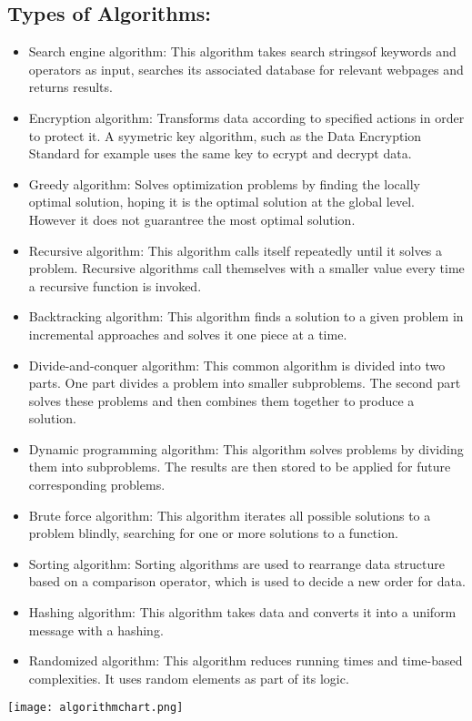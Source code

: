 \documentclass[a4paper]{article}
\begin{document}
\subsection{Types of Algorithms:}
\begin{itemize}
    \item Search engine algorithm: This algorithm takes search stringsof keywords and operators as input, searches its associated database for relevant webpages and returns results.
    \item Encryption algorithm: Transforms data according to specified actions in order to protect it. A syymetric key algorithm, such as the Data Encryption Standard for example uses the same key to ecrypt and decrypt data.
    \item Greedy algorithm: Solves optimization problems by finding the locally optimal solution, hoping it is the optimal solution at the global level. However it does not guarantree the most optimal solution.
    \item Recursive algorithm: This algorithm calls itself repeatedly until it solves a problem. Recursive algorithms call themselves with a smaller value every time a recursive function is invoked.
    \item Backtracking algorithm: This algorithm finds a solution to a given problem in incremental approaches and solves it one piece at a time.
    \item Divide-and-conquer algorithm: This common algorithm is divided into two parts. One part divides a problem into smaller subproblems. The second part solves these problems and then combines them together to produce a solution.
    \item Dynamic programming algorithm: This algorithm solves problems by dividing them into subproblems. The results are then stored to be applied for future corresponding problems.
    \item Brute force algorithm: This algorithm iterates all possible solutions to a problem blindly, searching for one or more solutions to a function.
    \item Sorting algorithm: Sorting algorithms are used to rearrange data structure based on a comparison operator, which is used to decide a new order for data.
    \item Hashing algorithm: This algorithm takes data and converts it into a uniform message with a hashing.
    \item Randomized algorithm: This algorithm reduces running times and time-based complexities. It uses random elements as part of its logic.
\end{itemize}

\vspace{0.5cm}
\texttt{[image: algorithmchart.png]}
\end{document}
